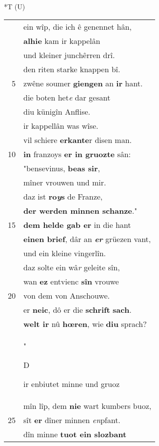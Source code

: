 \documentclass[8pt,a4paper,notitlepage]{article}
\begin{document}
\begin{table}[ht]
\begin{minipage}[t]{0.5\linewidth}
\end{minipage}
\hspace{0.5cm}
\begin{minipage}[t]{0.5\linewidth}
\small
\begin{center}*T (U)
\end{center}
\begin{tabular}{rl}
 & ein wîp, die ich ê genennet hân,\\ 
 & \textbf{alhie} kam ir kappelân\\ 
 & und kleiner junchêrren drî.\\ 
 & den riten starke knappen bî.\\ 
5 & zwêne soumer \textbf{giengen} an \textbf{ir} hant.\\ 
 & die boten het\textit{e} dar gesant\\ 
 & diu künigîn Anflise.\\ 
 & ir kappellân was wîse.\\ 
 & vil schiere \textbf{erkante}r disen man.\\ 
10 & \textbf{in} franzoys \textbf{er in gruozte} sân:\\ 
 & "bensevinus, \textbf{beas sir},\\ 
 & mîner vrouwen und mir.\\ 
 & daz ist \textbf{ro\textit{y}s} de Franze,\\ 
 & \textbf{der werden minnen schanze}."\\ 
15 & \textbf{dem helde gab er} in die hant\\ 
 & \textbf{einen brief}, dâr an \textit{\textbf{er}} grüezen vant,\\ 
 & und ein kleine vingerlîn.\\ 
 & daz solte ein wâ\textit{r} geleite sîn,\\ 
 & wan \textbf{ez} entvienc \textbf{sîn} vrouwe\\ 
20 & von dem von Anschouwe.\\ 
 & er \textbf{neic}, dô er die \textbf{schrift} \textbf{sach}.\\ 
 & \textbf{welt ir} nû \textbf{hœren}, wie \textbf{diu} sprach?\\ 
 & "\begin{large}D\end{large}ir enbiutet minne und gruoz\\ 
 & mîn lîp, dem \textbf{nie} wart kumbers buoz,\\ 
25 & sît \textbf{er} dîner minnen \textit{en}pfant.\\ 
 & dîn minne \textbf{tuot ein slozbant}\\ 

\end{tabular}
\end{minipage}
\end{table}
\end{document}
